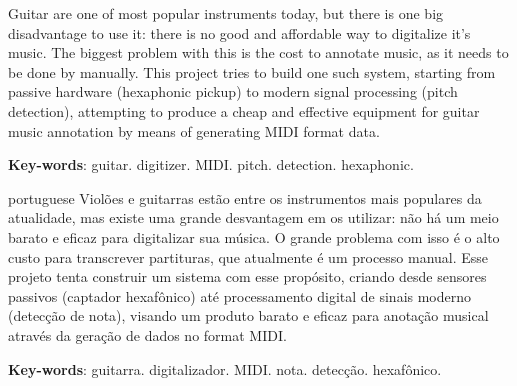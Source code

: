 \setlength{\absparsep}{18pt} %

\begin{summary}[Abstract]
  Guitar are one of most popular instruments today, but there is one big disadvantage
  to use it: there is no good and affordable way to digitalize it's music. The
  biggest problem with this is the cost to annotate music, as it needs to be done
  by manually. This project tries to build one such system, starting from passive
  hardware (hexaphonic pickup) to modern signal processing (pitch detection),
  attempting to produce a cheap and effective equipment for guitar music annotation
  by means of generating MIDI format data.


  \textbf{Key-words}: guitar. digitizer. MIDI. pitch. detection. hexaphonic.
\end{summary}

\begin{summary}[Resumo]
  \begin{otherlanguage*}{portuguese}
    Violões e guitarras estão entre os instrumentos mais populares da atualidade,
    mas existe uma grande desvantagem em os utilizar: não há um meio barato e eficaz
    para digitalizar sua música. O grande problema com isso é o alto custo para
    transcrever partituras, que atualmente é um processo manual. Esse projeto tenta
    construir um sistema com esse propósito, criando desde sensores passivos (captador
    hexafônico) até processamento digital de sinais moderno (detecção de nota),
    visando um produto barato e eficaz para anotação musical através da geração de
    dados no format MIDI.

    \textbf{Key-words}: guitarra. digitalizador. MIDI. nota. detecção. hexafônico.
  \end{otherlanguage*}

\end{summary}

%
%
%
